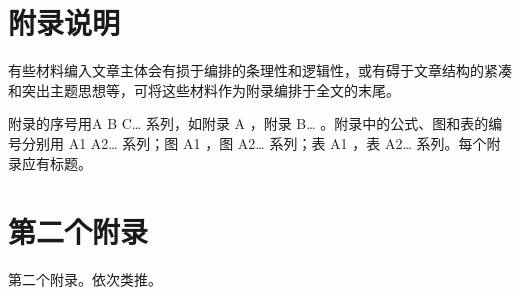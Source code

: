\begin{appendix}

  \chapter{附录说明}

  有些材料编入文章主体会有损于编排的条理性和逻辑性，或有碍于文章结构的紧凑和突出主题思想等，可将这些材料作为附录编排于全文的末尾。

  附录的序号用A B C… 系列，如附录 A ，附录 B… 。附录中的公式、图和表的编号分别用 A1 A2… 系列；图 A1 ，图 A2… 系列；表 A1 ，表 A2… 系列。每个附录应有标题。

  \chapter{第二个附录}

  第二个附录。依次类推。

\end{appendix}
